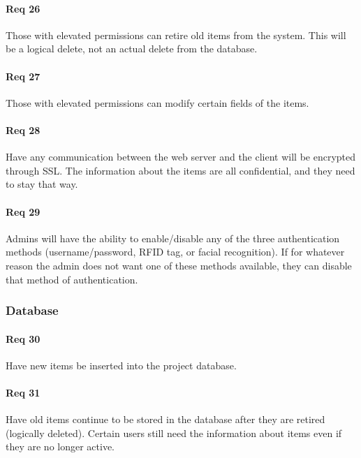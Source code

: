 \documentclass[10pt, onecolumn, twoside, peerreview]{IEEEtran}
\begin{document}
\paragraph*{Req 26} Those with elevated permissions can retire old items from the system. This will be a logical delete, not an actual
delete from the database.\\

\paragraph*{Req 27} Those with elevated permissions can modify certain fields of the items.\\

\paragraph*{Req 28} Have any communication between the web server and the client will be encrypted through SSL. The information about the
items are all confidential, and they need to stay that way.\\

\paragraph*{Req 29} Admins will have the ability to enable/disable any of the three authentication methods (username/password, RFID tag, or
facial recognition). If for whatever reason the admin does not want one of these methods available, they can disable
that method of authentication.\\

\subsubsection{Database}
\paragraph*{Req 30} Have new items be inserted into the project database.\\

\paragraph*{Req 31} Have old items continue to be stored in the database after they are retired (logically deleted). Certain users still
need the information about items even if they are no longer active.\\
\end{document}
